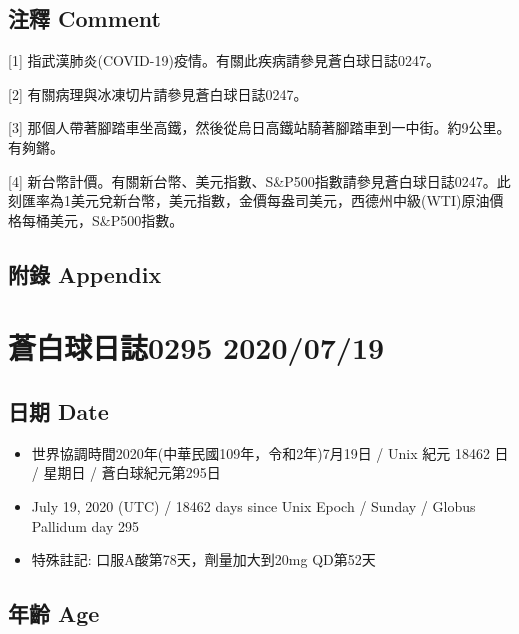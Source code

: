 \documentclass[a5paper, 11pt
]{book}
\providecommand{\tightlist}{%
  \setlength{\itemsep}{0pt}\setlength{\parskip}{0pt}}
\begin{document}
\hypertarget{ux6ce8ux91cb-comment-42}{%
\subsection{注釋 Comment}\label{ux6ce8ux91cb-comment-42}}

{[}1{]} 指武漢肺炎(COVID-19)疫情。有關此疾病請參見蒼白球日誌0247。

{[}2{]} 有關病理與冰凍切片請參見蒼白球日誌0247。

{[}3{]}
那個人帶著腳踏車坐高鐵，然後從烏日高鐵站騎著腳踏車到一中街。約9公里。有夠鏘。

{[}4{]}
新台幣計價。有關新台幣、美元指數、S\&P500指數請參見蒼白球日誌0247。此刻匯率為1美元兌新台幣，美元指數，金價每盎司美元，西德州中級(WTI)原油價格每桶美元，S\&P500指數。

\hypertarget{ux9644ux9304-appendix-42}{%
\subsection{附錄 Appendix}\label{ux9644ux9304-appendix-42}}

\hypertarget{ux84bcux767dux7403ux65e5ux8a8c0295-20200719}{%
\section{蒼白球日誌0295
2020/07/19}\label{ux84bcux767dux7403ux65e5ux8a8c0295-20200719}}

\hypertarget{ux65e5ux671f-date-43}{%
\subsection{日期 Date}\label{ux65e5ux671f-date-43}}

\begin{itemize}
\tightlist
\item
  世界協調時間2020年(中華民國109年，令和2年)7月19日 / Unix 紀元 18462 日
  / 星期日 / 蒼白球紀元第295日
\item
  July 19, 2020 (UTC) / 18462 days since Unix Epoch / Sunday / Globus
  Pallidum day 295
\item
  特殊註記: 口服A酸第78天，劑量加大到20mg QD第52天
\end{itemize}

\hypertarget{ux5e74ux9f61-age-43}{%
\subsection{年齡 Age}\label{ux5e74ux9f61-age-43}}
\end{document}
